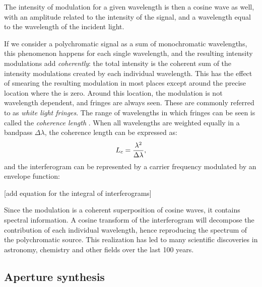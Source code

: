 The intensity of modulation for a given wavelength is then a cosine wave as well, with an amplitude related to the intensity of the signal, and a wavelength equal to the wavelength of the incident light.

If we consider a polychromatic signal as a sum of monochromatic wavelengths, this phenomenon happens for each single wavelength, and the resulting intensity modulations add \textit{coherently}: the total intensity is the coherent sum of the intensity modulations created by each individual wavelength. This has the effect of smearing the resulting modulation in most places except around the precise location where the \OPD is zero. Around this location, the modulation is not wavelength dependent, and fringes are always seen. These are commonly referred to as \textit{white light fringes}. The range of wavelengths in which fringes can be seen is called the \textit{coherence length} \Lc. When all wavelengths are weighted equally in a bandpass $\Delta\lambda$, the coherence length can be expressed as:
\begin{equation}
L_c = \frac{\lambda^2}{\Delta\lambda},
\end{equation}
and the interferogram can be represented by a carrier frequency modulated by an envelope function:

[add equation for the integral of interferograms]

Since the modulation is a coherent superposition of cosine waves, it contains spectral information. A cosine transform of the interferogram will decompose the contribution of each individual wavelength, hence reproducing the spectrum of the polychromatic source. This realization has led to many scientific discoveries in astronomy, chemistry and other fields over the last 100 years.

\subsection{Aperture synthesis}


